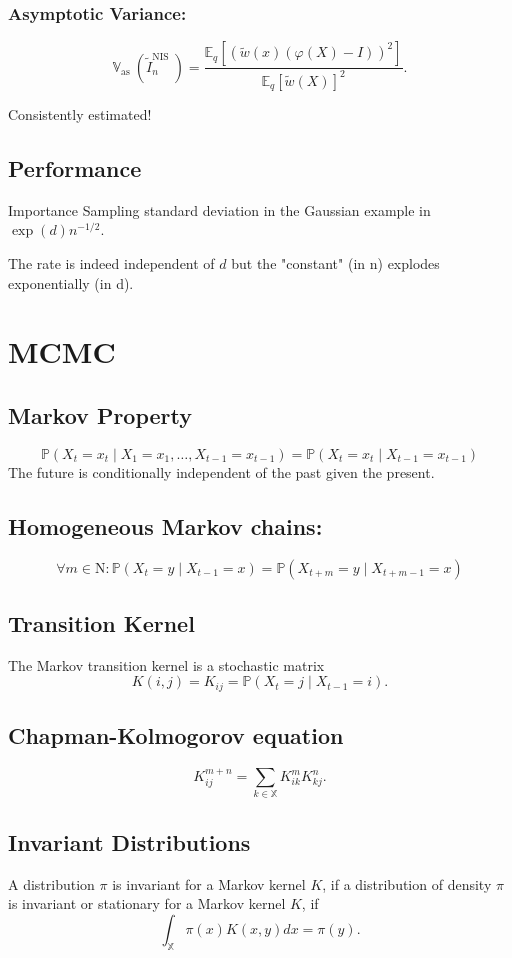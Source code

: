 \documentclass{article}
\begin{document}
\subsubsection{Asymptotic Variance:}

$$
\mathbb{V}_{\text {as }}\left(\tilde{I}_n^{\text {NIS }}\right)=\frac{\mathbb{E}_q\left[(\widetilde{w}(x)(\varphi(X)-I))^2\right]}{\mathbb{E}_q[\widetilde{w}(X)]^2} .
$$

Consistently estimated!

\subsection{Performance}
Importance Sampling standard deviation in the Gaussian example in $\exp (d) n^{-1 / 2}$.

The rate is indeed independent of $d$ but the "constant" (in n) explodes exponentially (in d).

\section{MCMC}
\subsection{Markov Property}
$$
\mathbb{P}\left(X_t=x_t \mid X_1=x_1, \ldots, X_{t-1}=x_{t-1}\right)=\mathbb{P}\left(X_t=x_t \mid X_{t-1}=x_{t-1}\right)
$$
The future is conditionally independent of the past given the present.
\subsection{Homogeneous Markov chains:}
$$
\forall m \in \mathrm{N}: \mathbb{P}\left(X_t=y \mid X_{t-1}=x\right)=\mathbb{P}\left(X_{t+m}=y \mid X_{t+m-1}=x\right)
$$
\subsection{Transition Kernel}
The Markov transition kernel is a stochastic matrix
$$
K(i, j)=K_{i j}=\mathbb{P}\left(X_t=j \mid X_{t-1}=i\right) .
$$
\subsection{Chapman-Kolmogorov equation}
$$
K_{i j}^{m+n}=\sum_{k \in \mathbb{X}} K_{i k}^m K_{k j}^n .
$$
\subsection{Invariant Distributions}
A distribution $\pi$ is invariant for a Markov kernel $K$, if
a distribution of density $\pi$ is invariant or stationary for a Markov kernel $K$, if
$$
\int_{\mathbb{X}} \pi(x) K(x, y) d x=\pi(y) .
$$
\end{document}
